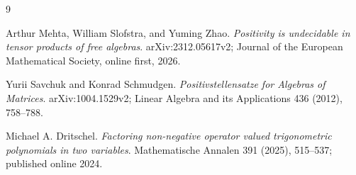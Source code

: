 \documentclass[11pt]{article}
\begin{document}
\begin{thebibliography}{9}

Arthur Mehta, William Slofstra, and Yuming Zhao.
\newblock \emph{Positivity is undecidable in tensor products of free algebras}.
\newblock arXiv:2312.05617v2; Journal of the European Mathematical Society,
online first, 2026.

Yurii Savchuk and Konrad Schmudgen.
\newblock \emph{Positivstellensatze for Algebras of Matrices}.
\newblock arXiv:1004.1529v2; Linear Algebra and its Applications
436 (2012), 758--788.

Michael A. Dritschel.
\newblock \emph{Factoring non-negative operator valued trigonometric
polynomials in two variables}.
\newblock Mathematische Annalen 391 (2025), 515--537; published online 2024.

\end{thebibliography}
\end{document}
